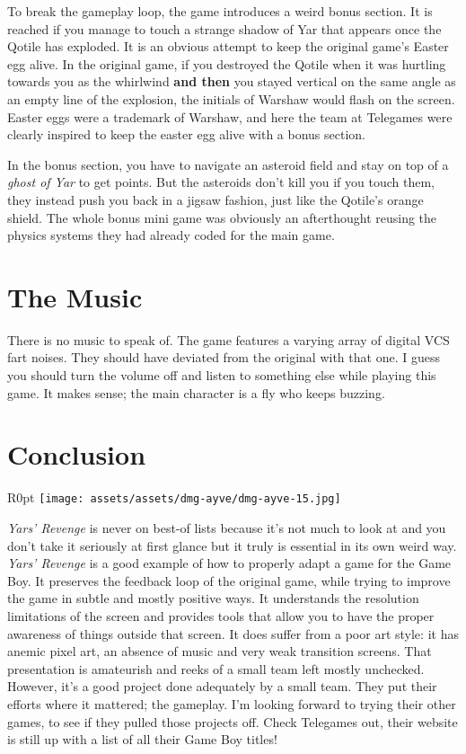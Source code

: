 \documentclass{book}
\begin{document}
To break the gameplay loop, the game introduces a weird bonus section. It is reached if you manage to touch a strange shadow of Yar that appears once the Qotile has exploded. It is an obvious attempt to keep the original game’s Easter egg alive. In the original game, if you destroyed the Qotile when it was hurtling towards you as the whirlwind \textbf{and then} you stayed vertical on the same angle as an empty line of the explosion, the initials of Warshaw would flash on the screen. Easter eggs were a trademark of Warshaw, and here the team at Telegames were clearly inspired to keep the easter egg alive with a bonus section.

In the bonus section, you have to navigate an asteroid field and stay on top of a \emph{ghost of Yar} to get points. But the asteroids don’t kill you if you touch them, they instead push you back in a jigsaw fashion, just like the Qotile’s orange shield. The whole bonus mini game was obviously an afterthought reusing the physics systems they had already coded for the main game.

\FloatBarrier\needspace{10mm}\section*{The Music}\nopagebreak[4]

There is no music to speak of. The game features a varying array of digital VCS fart noises. They should have deviated from the original with that one. I guess you should turn the volume off and listen to something else while playing this game. It makes sense; the main character is a fly who keeps buzzing.

\FloatBarrier\needspace{10mm}\section*{Conclusion}\nopagebreak[4]

\begin{wrapfigure}{R}{0pt} \texttt{[image: assets/assets/dmg-ayve/dmg-ayve-15.jpg]}\end{wrapfigure}
\emph{Yars’ Revenge} is never on best-of lists because it’s not much to look at and you don’t take it seriously at first glance but it truly is essential in its own weird way. \emph{Yars’ Revenge} is a good example of how to properly adapt a game for the Game Boy. It preserves the feedback loop of the original game, while trying to improve the game in subtle and mostly positive ways. It understands the resolution limitations of the screen and provides tools that allow you to have the proper awareness of things outside that screen. It does suffer from a poor art style: it has anemic pixel art, an absence of music and very weak transition screens. That presentation is amateurish and reeks of a small team left mostly unchecked. However, it’s a good project done adequately by a small team. They put their efforts where it mattered; the gameplay. I’m looking forward to trying their other games, to see if they pulled those projects off. Check Telegames out, their website is still up with a list of all their Game Boy titles!
\end{document}
